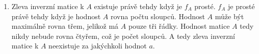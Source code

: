 \documentclass[12pt]{article}
\begin{document}
\begin{enumerate}
\begin{enumerate}
        \item Zleva inverzní matice k $A$ existuje právě tehdy když je $f_A$ prosté.
          $f_A$ je prosté právě tehdy když je hodnost $A$ rovna počtu sloupců.
          Hodnost $A$ může být maximálně rovna třem, jelikož má $A$ pouze tři řádky.
          Hodnost matice $A$ tedy nikdy nebude rovna čtyřem, což je počet sloupců. A tedy zleva inverzní matice
          k $A$ neexistuje za jakýchkoli hodnot $a$.

      \end{enumerate}


          
\end{enumerate}
\end{document}
